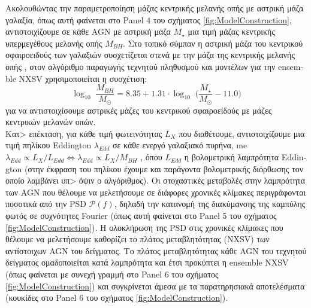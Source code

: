 Ακολουθώντας την παραμετροποίηση μάζας κεντρικής μελανής οπής με αστρική μάζα γαλαξία, όπως αυτή φαίνεται στο \textlatin{Panel 4} του σχήματος \ref{fig:ModelConstruction}, αντιστοιχίζουμε σε κάθε \textlatin{AGN} με αστρική μάζα $M_{\star}$ μια τιμή μάζας κεντρικής υπερμεγέθους μελανής οπής $M_{BH}$. Στο τοπικό σύμπαν η αστρική μάζα του κεντρικού σφαιροειδούς των γαλαξιών συσχετίζεται στενά με την μάζα της κεντρικής μελανής οπής \cite{shankar}\cite{savorgnan}, στον αλγόριθμο παραγωγής τεχνητού πληθυσμού και μοντέλων για την \textlatin{ensemble NXSV} χρησιμοποιείται η συσχέτιση\cite{savorgnan}: 
$$\log_{10}\; \frac{M_{BH}}{M_\odot} = 8.35 + 1.31 \cdot \log_{10}\; \big( \frac{M_\star}{M_\odot} -11.0 \big)  $$
για να αντιστοιχίσουμε αστρικές μάζες του κεντρικού σφαιροείδούς με μάζες κεντρικών μελανών οπών. \\
Κατ> επέκταση, για κάθε τιμή φωτεινότητας $L_X$ που διαθέτουμε, αντιστοιχίζουμε μια τιμή πηλίκου \textlatin{Eddington} $\lambda_{Edd}$ σε κάθε ενεργό γαλαξιακό πυρήνα, me $\lambda_{Edd} \propto L_X/L_{Edd} \iff \lambda_{Edd} \propto L_X/M_{BH}$ , όπου $L_{Edd}$ η βολομετρική λαμπρότητα \textlatin{Eddington} (στην έκφραση του πηλίκου έχουμε και παράγοντα βολομετρικής διόρθωσης\cite{duras2020} τον οποίο λαμβάνει υπ> όψιν ο αλγόριθμος).  
Οι στοχαστικές μεταβολές στην λαμπρότητα των \textlatin{AGN} που θέλουμε να μελετήσουμε σε διάφορες χρονικές κλίμακες περιγράφονται ποσοτικά από την \textlatin{PSD} $\mathcal{P}(f)$, δηλαδή την κατανομή της διακύμανσης της καμπύλης φωτός σε συχνότητες \textlatin{Fourier} (όπως αυτή φαίνεται στο \textlatin{Panel 5} του σχήματος \ref{fig:ModelConstruction}).
Η ολοκλήρωση της \textlatin{PSD} στις χρονικές κλίμακες που θέλουμε να μελετήσουμε καθορίζει το πλάτος μεταβλητότητας (\textlatin{NXSV}) των αντίστοιχων \textlatin{AGN} του δείγματος. Το πλάτος μεταβλητότητας κάθε \textlatin{AGN} του τεχνητού δείγματος ομαδοποιείται κατά λαμπρότητα και έτσι προκύπτει η \textlatin{ensemble NXSV} (όπως φαίνεται με συνεχή γραμμή στο \textlatin{Panel 6} του σχήματος \ref{fig:ModelConstruction}) και συγκρίνεται άμεσα με τα παρατηρησιακά αποτελέσματα (κουκίδες στο \textlatin{Panel 6} του σχήματος \ref{fig:ModelConstruction})\cite{VAR}. 


